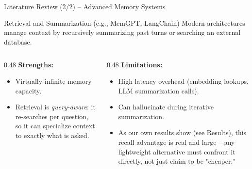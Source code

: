 \documentclass[aspectratio=169]{beamer}
\begin{document}
\begin{frame}{Literature Review (2/2) -- Advanced Memory Systems}
    \begin{block}{Retrieval and Summarization (e.g., MemGPT, LangChain)}
        Modern architectures manage context by recursively summarizing past turns or searching an external database.
    \end{block}

    \begin{columns}[T]
        \begin{column}{0.48\textwidth}
            \textbf{Strengths:}
            \begin{itemize}
                \item Virtually infinite memory capacity.
                \item Retrieval is \emph{query-aware}: it re-searches per question, so it can specialize context to exactly what is asked.
            \end{itemize}
        \end{column}

        \begin{column}{0.48\textwidth}
            \textbf{Limitations:}
            \begin{itemize}
                \item High latency overhead (embedding lookups, LLM summarization calls).
                \item Can hallucinate during iterative summarization.
                \item As our own results show (see Results), this recall advantage is real and large -- any lightweight alternative must confront it directly, not just claim to be "cheaper."
            \end{itemize}
        \end{column}
    \end{columns}
\end{frame}
\end{document}
